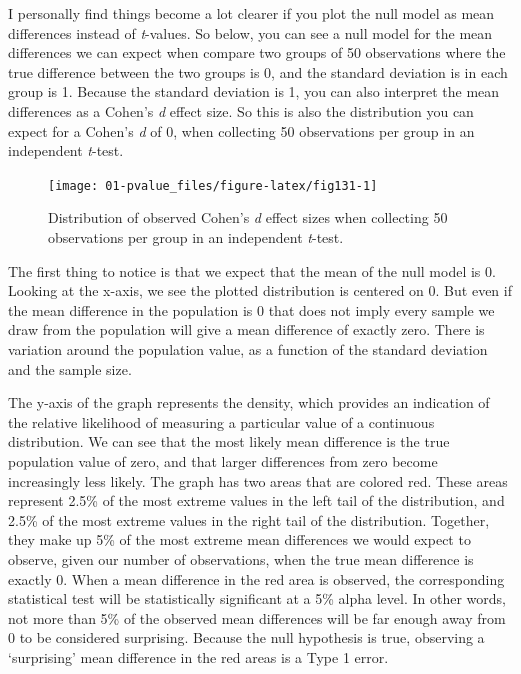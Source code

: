 \documentclass[
  oneside]{book}
\begin{document}
I personally find things become a lot clearer if you plot the null model as mean differences instead of \emph{t}-values. So below, you can see a null model for the mean differences we can expect when compare two groups of 50 observations where the true difference between the two groups is 0, and the standard deviation is in each group is 1. Because the standard deviation is 1, you can also interpret the mean differences as a Cohen's \emph{d} effect size. So this is also the distribution you can expect for a Cohen's \emph{d} of 0, when collecting 50 observations per group in an independent \emph{t}-test.



\begin{figure}

{\centering \texttt{[image: 01-pvalue\_files/figure-latex/fig131-1]} 

}

\caption{Distribution of observed Cohen's \emph{d} effect sizes when collecting 50 observations per group in an independent \emph{t}-test.}\label{fig:fig131}
\end{figure}

The first thing to notice is that we expect that the mean of the null model is 0. Looking at the x-axis, we see the plotted distribution is centered on 0. But even if the mean difference in the population is 0 that does not imply every sample we draw from the population will give a mean difference of exactly zero. There is variation around the population value, as a function of the standard deviation and the sample size.

The y-axis of the graph represents the density, which provides an indication of the relative likelihood of measuring a particular value of a continuous distribution. We can see that the most likely mean difference is the true population value of zero, and that larger differences from zero become increasingly less likely. The graph has two areas that are colored red. These areas represent 2.5\% of the most extreme values in the left tail of the distribution, and 2.5\% of the most extreme values in the right tail of the distribution. Together, they make up 5\% of the most extreme mean differences we would expect to observe, given our number of observations, when the true mean difference is exactly 0. When a mean difference in the red area is observed, the corresponding statistical test will be statistically significant at a 5\% alpha level. In other words, not more than 5\% of the observed mean differences will be far enough away from 0 to be considered surprising. Because the null hypothesis is true, observing a `surprising' mean difference in the red areas is a Type 1 error.
\end{document}
